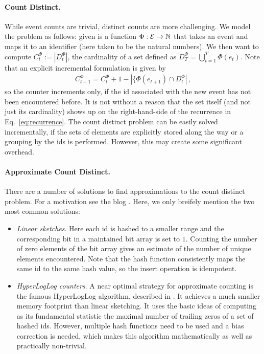 \documentclass{article}
\newcommand{\NN}{{\mathbb N}}
\begin{document}
\paragraph{Count Distinct.} While event counts are trivial, distinct counts are more challenging. We model the problem as follows: given is a function $\Phi: {\cal E} \to \NN$ that takes an event and maps it to an identifier (here taken to be the natural numbers). We then want to compute $C_t^\Phi := | D_t^\Phi |$, the cardinality of a set defined as $D_T^\Phi = \bigcup_{t=1}^T \Phi(e_t)$. Note that an explicit incremental formulation is given by 
\begin{align}
C_{t+1}^\Phi = C_t^\Phi + 1 - | \{ \Phi(e_{t+1}) \cap D_t^\Phi |\,,
\label{eq:recurrence}
\end{align}
so the counter increments only, if the id associated with the new event has not been encountered before. It is not without a reason that the set itself (and not just its cardinality) shows up on the right-hand-side of the recurrence in Eq.~\eqref{eq:recurrence}. 
The count distinct problem can be easily solved incrementally, if the sets of elements are explicitly stored along the way or a grouping by the ids is performed. However, this may create some significant overhead. 

\paragraph{Approximate Count Distinct.} 

There are a number of solutions to find approximations to the count distinct problem. For a motivation see the blog \cite{bigdatacounting}. Here, we only breifely mention the two most common solutions: 
\begin{itemize}
\item \textit{Linear sketches}. Here each id is hashed to a smaller range and the corresponding bit in a maintained  bit array is set to $1$. Counting the number of zero elements of the bit array gives an estimate of the number of unique elements encountered. Note that the hash function consistently maps the same id to the same hash value, so the insert operation is idempotent. 
\item \textit{HyperLogLog counters}.  A near optimal strategy for approximate counting is the famous HyperLogLog algorithm, described in \cite{flajolet2008hyperloglog}. It achieves a much smaller memory footprint than linear sketching. It uses the basic ideas of computing as its fundamental statistic the maximal number of trailing zeros of a set of hashed ids. However, multiple hash functions need to be used and a bias correction is needed, which makes this algorithm mathematically as well as practically non-trivial. 
\end{itemize}
\end{document}
